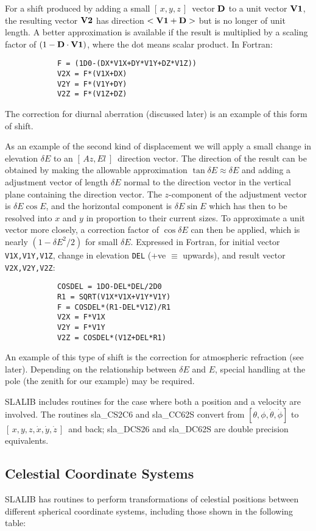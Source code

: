 \documentclass[11pt,twoside]{article}
\newcommand{\azel}      {$[\,Az,El~]$}
\newcommand{\xyz}       {$[\,x,y,z\,]$}
\newcommand{\xyzxyzd}   {$[\,x,y,z,\dot{x},\dot{y},\dot{z}\,]$}
\begin{document}
For a shift produced by adding a small \xyz\ vector ${\bf D}$ to a
unit vector ${\bf V1}$, the resulting vector ${\bf V2}$ has direction
$<{\bf V1}+{\bf D}>$ but is no longer of unit length.  A better approximation
is available if the result is multiplied by a scaling factor of
$(1-{\bf D}\cdot{\bf V1})$, where the dot
means scalar product.  In Fortran:
\goodbreak
\begin{verbatim}
            F = (1D0-(DX*V1X+DY*V1Y+DZ*V1Z))
            V2X = F*(V1X+DX)
            V2Y = F*(V1Y+DY)
            V2Z = F*(V1Z+DZ)
\end{verbatim}
\goodbreak
\noindent
The correction for diurnal aberration (discussed later) is
an example of this form of shift.

As an example of the second kind of displacement
we will apply a small change in elevation $\delta E$ to an
\azel\ direction vector.  The direction of the
result can be obtained by making the allowable approximation
${\tan \delta E\approx\delta E}$ and adding a adjustment
vector of length $\delta E$ normal
to the direction vector in the vertical plane containing the direction
vector.  The $z$-component of the adjustment vector is
$\delta E \cos E$,
and the horizontal component is
$\delta E \sin E$ which has then to be
resolved into $x$ and $y$ in proportion to their current sizes. To
approximate a unit vector more closely, a correction factor of
$\cos \delta E$ can then be applied, which is nearly
$(1-\delta E^2 /2)$ for
small $\delta E$.  Expressed in Fortran, for initial vector
{\tt V1X,V1Y,V1Z}, change in elevation {\tt DEL}
(+ve $\equiv$ upwards), and result
vector {\tt V2X,V2Y,V2Z}:
\goodbreak
\begin{verbatim}
            COSDEL = 1DO-DEL*DEL/2D0
            R1 = SQRT(V1X*V1X+V1Y*V1Y)
            F = COSDEL*(R1-DEL*V1Z)/R1
            V2X = F*V1X
            V2Y = F*V1Y
            V2Z = COSDEL*(V1Z+DEL*R1)
\end{verbatim}
\goodbreak
An example of this type of shift is the correction for atmospheric
refraction (see later).
Depending on the relationship between $\delta E$ and $E$, special
handling at the pole (the zenith for our example) may be required.

SLALIB includes routines for the case where both a position
and a velocity are involved.  The routines
sla\_CS2C6
and
sla\_CC62S
convert from $[\theta,\phi,\dot{\theta},\dot{\phi}]$
to \xyzxyzd\ and back;
sla\_DCS26
and
sla\_DC62S
are double precision equivalents.

\subsection {Celestial Coordinate Systems}
SLALIB has routines to perform transformations
of celestial positions between different spherical
coordinate systems, including those shown in the following table:
\end{document}
